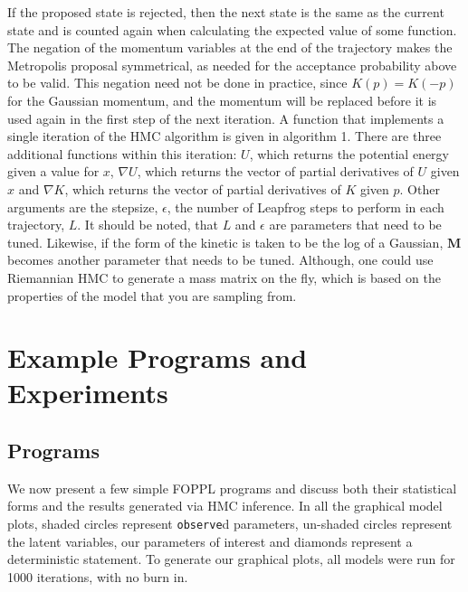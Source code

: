 \documentclass[twoside]{article}
\begin{document}
If the proposed state is rejected, then the next state is the same as the current state and is counted again when calculating the expected value of some function. 
The negation of the momentum variables at the end of the trajectory makes the Metropolis proposal symmetrical, as needed for the acceptance probability above to be valid. This negation need not be done in practice, since $K(p) = K(-p)$ for the Gaussian momentum, and the momentum will be replaced before it is used again in the first step of the next iteration.
A function that implements a single iteration of the HMC algorithm is given in algorithm 1. There are three additional functions within this iteration: $U$, which returns the potential energy given a value for $x$,  $\nabla U$, which returns the vector of partial derivatives of $U$ given $x$ and $\nabla K$, which returns the vector of partial derivatives of $K$ given $p$. Other arguments are the stepsize, $\epsilon$, the number of Leapfrog steps to perform in each trajectory, $L$. It should be noted, that $L$ and $\epsilon$ are parameters that need to be tuned. Likewise, if the form of the kinetic is taken to be the log of a Gaussian, $\textbf{M}$ becomes another parameter that needs to be tuned. Although, one could use Riemannian HMC \citep{girolami2011riemann} to generate a mass matrix on the fly, which is based on the properties of the model that you are sampling from.

\section{Example Programs and Experiments}
\label{sec:exampprog}
\subsection{Programs}

We now present a few simple FOPPL programs and discuss both their statistical forms and the results generated via HMC inference. In all the graphical model plots, shaded circles represent \texttt{observe}d parameters, un-shaded circles represent the latent variables, our parameters of interest and diamonds represent a deterministic statement. To generate our graphical plots, all models were run for 1000 iterations, with no burn in.  
\end{document}
